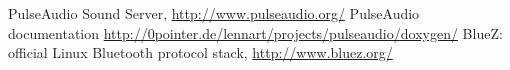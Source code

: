 \documentclass[conference]{IEEEtran}
\begin{document}
\begin{thebibliography}{1}
		PulseAudio Sound Server,
		\url{http://www.pulseaudio.org/}
		PulseAudio documentation
		\url{http://0pointer.de/lennart/projects/pulseaudio/doxygen/}
		BlueZ: official Linux Bluetooth protocol stack,
		\url{http://www.bluez.org/}

\end{thebibliography}
\end{document}
